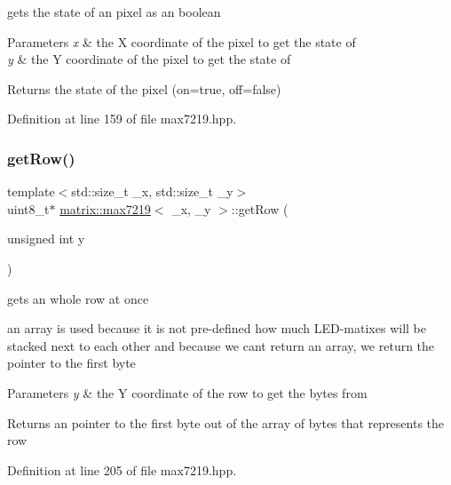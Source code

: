 gets the state of an pixel as an boolean 


\begin{DoxyParams}{Parameters}
{\em x} & the X coordinate of the pixel to get the state of \\
\hline
{\em y} & the Y coordinate of the pixel to get the state of \\
\hline
\end{DoxyParams}
\begin{DoxyReturn}{Returns}
the state of the pixel (on=true, off=false) 
\end{DoxyReturn}


Definition at line 159 of file max7219.\+hpp.

\mbox{\label{classmatrix_1_1max7219_a48ff4d31e9bc3fd93be73406830e3d62}} 
\subsubsection{\texorpdfstring{get\+Row()}{getRow()}}
{\footnotesize\ttfamily template$<$std\+::size\+\_\+t \+\_\+x, std\+::size\+\_\+t \+\_\+y$>$ \\
uint8\+\_\+t$\ast$ \mbox{\hyperlink{classmatrix_1_1max7219}{matrix\+::max7219}}$<$ \+\_\+x, \+\_\+y $>$\+::get\+Row (\begin{DoxyParamCaption}\item[{unsigned int}]{y }\end{DoxyParamCaption})\hspace{0.3cm}{\ttfamily [inline]}}



gets an whole row at once 

an array is used because it is not pre-\/defined how much L\+E\+D-\/matixes will be stacked next to each other and because we can\textquotesingle{}t return an array, we return the pointer to the first byte 
\begin{DoxyParams}{Parameters}
{\em y} & the Y coordinate of the row to get the bytes from \\
\hline
\end{DoxyParams}
\begin{DoxyReturn}{Returns}
an pointer to the first byte out of the array of bytes that represents the row 
\end{DoxyReturn}


Definition at line 205 of file max7219.\+hpp.

